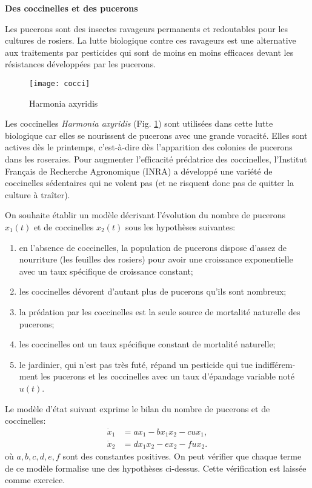 \begin{exemple}{\bf Des coccinelles et des pucerons}

Les pucerons sont des insectes ravageurs permanents et redoutables pour les cultures de rosiers. La lutte biologique contre ces ravageurs est une alternative aux traitements par pesticides qui sont de moins en moins efficaces devant les résistances développées par les pucerons. 
\begin{figure}[ht]
\begin{center}
\texttt{[image: cocci]}
\caption{Harmonia axyridis}
\label{fig:cocci}
\end{center}
\end{figure}
Les coccinelles {\em Harmonia axyridis} (Fig. \ref{fig:cocci}) sont utilisées dans cette lutte biologique car elles se nourissent de pucerons avec une grande voracité. Elles sont actives dès le printemps, c'est-à-dire dès l'apparition des colonies de pucerons dans les roseraies. Pour augmenter l'efficacité prédatrice des coccinelles, l'Institut Fran\c cais de Recherche Agronomique (INRA) a développé une variété de coccinelles \og sédentaires \gf qui ne volent pas (et ne risquent donc pas de quitter la culture à tra\^ iter).

On souhaite établir un modèle décrivant l'évolution du nombre de pucerons $x_1(t)$ et de coccinelles $x_2(t)$ sous les hypothèses suivantes:
\begin{enumerate}
\item en l'absence de coccinelles, la population de pucerons dispose d'assez de nourriture (les feuilles des rosiers) pour avoir une croissance exponentielle avec un taux spécifique de croissance constant;
\item les coccinelles dévorent d'autant plus de pucerons qu'ils sont nombreux;
\item la prédation par les coccinelles est la seule source de mortalité naturelle des pucerons;
\item les coccinelles ont un taux spécifique constant de mortalité naturelle;
\item le jardinier, qui n'est pas très futé, répand un pesticide qui tue indifférem-ment les pucerons et les coccinelles avec un taux d'épandage variable noté $u(t)$.
\end{enumerate}
Le modèle d'état suivant exprime le bilan du nombre de pucerons et de coccinelles:
\begin{equation} \begin{split}  \label{coc}
\dot x_1 &= ax_1 - bx_1x_2 - cux_1, \\
\dot x_2 &= dx_1x_2 - ex_2 - fux_2. 
\end{split} \end{equation} 
où $a,b,c,d,e,f$ sont des constantes positives. On peut vérifier que chaque terme de ce modèle formalise une des hypothèses ci-dessus. Cette vérification est laissée comme exercice.


\end{exemple}
